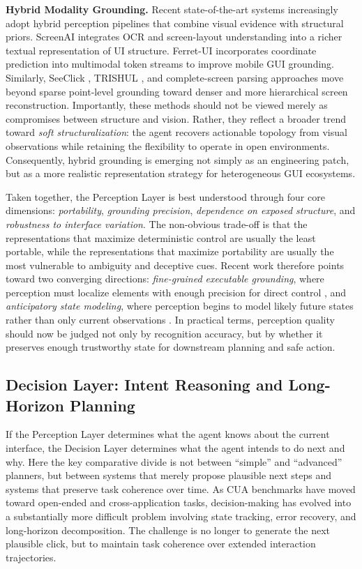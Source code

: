 \textbf{Hybrid Modality Grounding.}  
Recent state-of-the-art systems increasingly adopt hybrid perception pipelines that combine visual evidence with structural priors. ScreenAI \cite{baechler2024screenai} integrates OCR and screen-layout understanding into a richer textual representation of UI structure. Ferret-UI \cite{you2024ferret} incorporates coordinate prediction into multimodal token streams to improve mobile GUI grounding. Similarly, SeeClick \cite{cheng2024seeclick}, TRISHUL \cite{singh2025trishul}, and complete-screen parsing approaches \cite{gurbuz2026moving} move beyond sparse point-level grounding toward denser and more hierarchical screen reconstruction. Importantly, these methods should not be viewed merely as compromises between structure and vision. Rather, they reflect a broader trend toward \emph{soft structuralization}: the agent recovers actionable topology from visual observations while retaining the flexibility to operate in open environments. Consequently, hybrid grounding is emerging not simply as an engineering patch, but as a more realistic representation strategy for heterogeneous GUI ecosystems.

Taken together, the Perception Layer is best understood through four core dimensions: \emph{portability}, \emph{grounding precision}, \emph{dependence on exposed structure}, and \emph{robustness to interface variation}. The non-obvious trade-off is that the representations that maximize deterministic control are usually the least portable, while the representations that maximize portability are usually the most vulnerable to ambiguity and deceptive cues. Recent work therefore points toward two converging directions: \emph{fine-grained executable grounding}, where perception must localize elements with enough precision for direct control \cite{yuan2025segui}, and \emph{anticipatory state modeling}, where perception begins to model likely future states rather than only current observations \cite{luo2025vimo}. In practical terms, perception quality should now be judged not only by recognition accuracy, but by whether it preserves enough trustworthy state for downstream planning and safe action.

\subsection{Decision Layer: Intent Reasoning and Long-Horizon Planning}

If the Perception Layer determines what the agent knows about the current interface, the Decision Layer determines what the agent intends to do next and why. Here the key comparative divide is not between ``simple'' and ``advanced'' planners, but between systems that merely propose plausible next steps and systems that preserve task coherence over time. As CUA benchmarks have moved toward open-ended and cross-application tasks, decision-making has evolved into a substantially more difficult problem involving state tracking, error recovery, and long-horizon decomposition. The challenge is no longer to generate the next plausible click, but to maintain task coherence over extended interaction trajectories.

